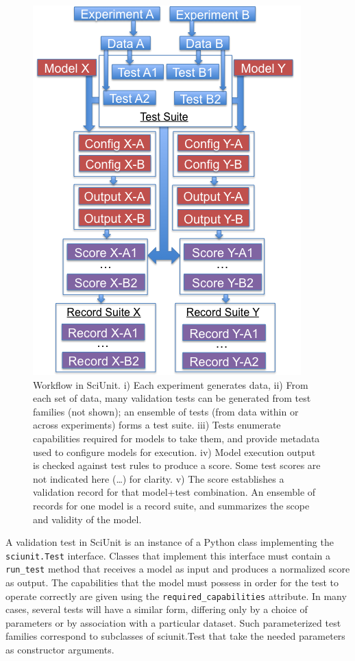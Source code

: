 \documentclass[11pt,letterpaper]{article}
\begin{document}
\begin{figure}
\includegraphics[scale=0.5]{sciunit_flowchart.png}
\caption{Workflow in SciUnit. \scriptsize{i) Each experiment generates data, ii) From each set of data, many validation tests can be generated from test families (not shown); an ensemble of tests (from data within or across experiments) forms a test suite.  iii) Tests enumerate capabilities required for models to take them, and provide metadata used to configure models for execution.  iv) Model execution output is checked against test rules to produce a score.  Some test scores are not indicated here (…) for clarity.  v) The score establishes a validation record for that model+test combination.  An ensemble of records for one model is a record suite, and summarizes the scope and validity of the model.}}
\label{fig:sciunit_flowchart}
\end{figure}

A validation test in SciUnit is an instance of a Python class implementing the \verb|sciunit.Test| interface. Classes that implement this interface must contain a \verb|run_test| method that receives a model as input and produces a normalized score as output. The capabilities that the model must possess in order for the test to operate correctly are given using the \verb|required_capabilities| attribute. In many cases, several tests will have a similar form, differing only by a choice of parameters or by association with a particular dataset. Such parameterized test families correspond to subclasses of sciunit.Test that take the needed parameters as constructor arguments. 
\end{document}
